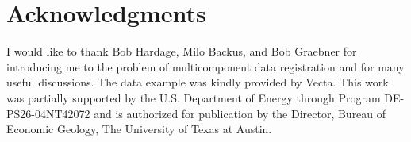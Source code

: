 \section{Acknowledgments}

I would like to thank Bob Hardage, Milo Backus, and Bob Graebner for
introducing me to the problem of multicomponent data registration and
for many useful discussions. The data example was kindly provided by
Vecta. This work was partially supported by the U.S. Department of
Energy through Program DE-PS26-04NT42072 and is authorized for
publication by the Director, Bureau of Economic Geology, The
University of Texas at Austin.





